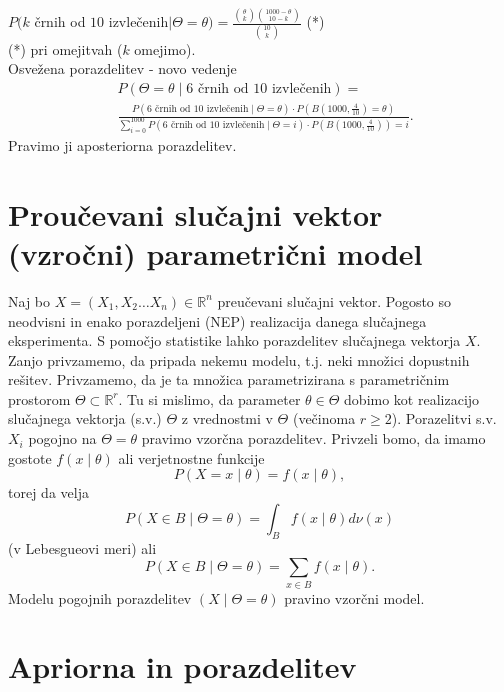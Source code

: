 \documentclass[a4paper, 12pt]{book}
\theoremstyle{definition}
\theoremstyle{remark}
\newcommand{\R}{\mathbb{R}}
\begin{document}
$P(k$ črnih od $10$ izvlečenih$ \mid \Theta = \theta) = \frac{\binom{\theta}{k} \binom{1000-\theta}{10-k}}{\binom{10}{k}}$ (*) \\
(*) pri omejitvah ($k$ omejimo). \\
Osvežena porazdelitev - novo vedenje \\
\begin{align*}
  &P(\Theta = \theta \mid 6 \text{ črnih od } 10 \text{ izvlečenih}) = \\
  &\frac{P(6 \text{ črnih od } 10 \text{ izvlečenih} \mid \Theta = \theta) \cdot P(B(1000, \frac{4}{10}) = \theta)}
    {\sum_{i=0}^{1000} P(6 \text{ črnih od } 10 \text{ izvlečenih} \mid \Theta = i) \cdot P(B(1000, \frac{4}{10})) = i}.
\end{align*}
Pravimo ji aposteriorna porazdelitev.


\section{Proučevani slučajni vektor (vzročni) parametrični model}

Naj bo $X = (X_1, X_2 \dots X_n) \in \R^n$ preučevani slučajni vektor.
Pogosto so neodvisni in enako porazdeljeni (NEP) realizacija danega slučajnega eksperimenta.
S pomočjo statistike lahko  porazdelitev slučajnega vektorja $X$.
Zanjo privzamemo, da pripada nekemu modelu, t.j. neki množici dopustnih rešitev.
Privzamemo, da je ta množica parametrizirana s parametričnim prostorom $\Theta \subset \R^r$.
Tu si mislimo, da parameter $\theta \in \Theta$ dobimo kot realizacijo slučajnega vektorja (s.v.) $\Theta$
z vrednostmi v $\Theta$ (večinoma $r \geq 2$).
Porazelitvi s.v. $X_i$ pogojno na $\Theta = \theta$ pravimo vzorčna porazdelitev.
Privzeli bomo, da imamo gostote $f(x \mid \theta)$ ali verjetnostne funkcije
\begin{equation*}
  P(X = x \mid \theta) = f(x \mid \theta),
\end{equation*}
torej da velja
\begin{equation*}
  P(X \in B \mid \Theta = \theta) = \int_B f(x \mid \theta) d\nu (x)
\end{equation*}
(v Lebesgueovi meri) ali
\begin{equation*}
  P(X \in B \mid \Theta = \theta) = \sum_{x \in B} f(x \mid \theta).
\end{equation*}
Modelu pogojnih porazdelitev $(X \mid \Theta = \theta)$ pravino vzorčni model.


\section{Apriorna in  porazdelitev}
\end{document}
